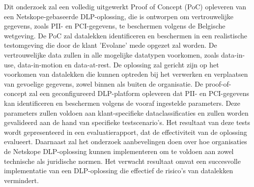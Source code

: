 Dit onderzoek zal een volledig uitgewerkt Proof of Concept (PoC) opleveren van een Netskope-gebaseerde DLP-oplossing, die is ontworpen om vertrouwelijke gegevens, 
zoals PII- en PCI-gegevens, te beschermen volgens de Belgische wetgeving. 
De PoC zal datalekken identificeren en beschermen in een realistische testomgeving die door de klant 'Evolane' mede opgezet zal worden. 
De vertrouwelijke data zullen in alle mogelijke datatypen voorkomen, zoals data-in-use, data-in-motion en data-at-rest. De oplossing zal gericht zijn op 
het voorkomen van datalekken die kunnen optreden bij het verwerken en verplaatsen van gevoelige gegevens, zowel binnen als buiten de organisatie.
De proof-of-concept zal een geconfigureerd DLP-platform opleveren dat PII- en PCI-gegevens kan identificeren en beschermen volgens de vooraf ingestelde parameters. 
Deze parameters zullen voldoen aan klant-specifieke dataclassificaties en zullen worden gevalideerd aan de hand van specifieke testscenario's. 
Het resultaat van deze tests wordt gepresenteerd in een evaluatierapport, dat de effectiviteit van de oplossing evalueert.
Daarnaast zal het onderzoek aanbevelingen doen over hoe organisaties de Netskope DLP-oplossing kunnen implementeren om te voldoen aan zowel technische als juridische normen. 
Het verwacht resultaat omvat een succesvolle implementatie van een DLP-oplossing die effectief de risico's van datalekken vermindert.




